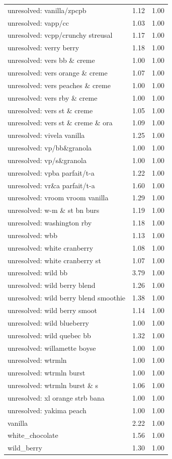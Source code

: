 \begin{table}
\begin{tabular}{lrr}
unresolved: vanilla/zpcpb & 1.12 & 1.00 \\
unresolved: vapp/cc & 1.03 & 1.00 \\
unresolved: vcpp/crunchy streusal & 1.17 & 1.00 \\
unresolved: verry berry & 1.18 & 1.00 \\
unresolved: vers bb \& creme & 1.00 & 1.00 \\
unresolved: vers orange \& creme & 1.07 & 1.00 \\
unresolved: vers peaches \& creme & 1.00 & 1.00 \\
unresolved: vers rby \& creme & 1.00 & 1.00 \\
unresolved: vers st \& creme & 1.05 & 1.00 \\
unresolved: vers st \& creme \& ora & 1.09 & 1.00 \\
unresolved: vivela vanilla & 1.25 & 1.00 \\
unresolved: vp/bb\&granola & 1.00 & 1.00 \\
unresolved: vp/s\&granola & 1.00 & 1.00 \\
unresolved: vpba parfait/t-a & 1.22 & 1.00 \\
unresolved: vr\&a parfait/t-a & 1.60 & 1.00 \\
unresolved: vroom vroom vanilla & 1.29 & 1.00 \\
unresolved: w-m \& st bn burs & 1.19 & 1.00 \\
unresolved: washington rby & 1.18 & 1.00 \\
unresolved: wbb & 1.13 & 1.00 \\
unresolved: white cranberry & 1.08 & 1.00 \\
unresolved: white cranberry st & 1.07 & 1.00 \\
unresolved: wild bb & 3.79 & 1.00 \\
unresolved: wild berry blend & 1.26 & 1.00 \\
unresolved: wild berry blend smoothie & 1.38 & 1.00 \\
unresolved: wild berry smoot & 1.14 & 1.00 \\
unresolved: wild blueberry & 1.00 & 1.00 \\
unresolved: wild quebec bb & 1.32 & 1.00 \\
unresolved: willamette boyse & 1.00 & 1.00 \\
unresolved: wtrmln & 1.00 & 1.00 \\
unresolved: wtrmln burst & 1.00 & 1.00 \\
unresolved: wtrmln burst \& s & 1.06 & 1.00 \\
unresolved: xl orange strb bana & 1.00 & 1.00 \\
unresolved: yakima peach & 1.00 & 1.00 \\
vanilla & 2.22 & 1.00 \\
white\_chocolate & 1.56 & 1.00 \\
wild\_berry & 1.30 & 1.00 \\
\bottomrule
\end{tabular}
\end{table}
